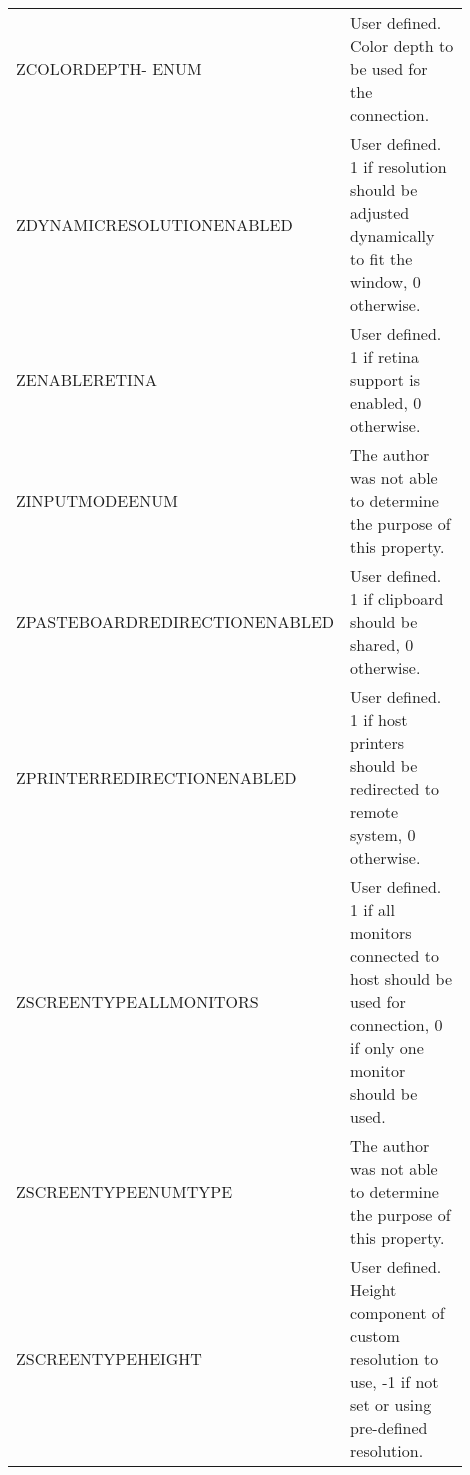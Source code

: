 \documentclass[journal]{IEEEtran}
\begin{document}
\begin{table}[h!]
\begin{tabular}{p{0.3\linewidth} | p{0.6\linewidth}}
ZCOLORDEPTH- ENUM               & User defined. Color depth to be used for the connection.                                                                                                                                       \\
ZDYNAMICRESOLUTIONENABLED     & User defined. 1 if resolution should be adjusted dynamically to fit the window, 0 otherwise. \\
ZENABLERETINA                 & User defined. 1 if retina support is enabled, 0 otherwise.                                                                                                                                     \\
ZINPUTMODEENUM                & The author was not able to determine the purpose of this property.                                                                                                                                                                                           \\
ZPASTEBOARDREDIRECTIONENABLED & User defined. 1 if clipboard should be shared, 0 otherwise.                                                                                                                                    \\
ZPRINTERREDIRECTIONENABLED    & User defined. 1 if host printers should be redirected to remote system, 0 otherwise.                                                                                                                                                                                           \\
ZSCREENTYPEALLMONITORS        & User defined. 1 if all monitors connected to host should be used for connection, 0 if only one monitor should be used.                                                                         \\
ZSCREENTYPEENUMTYPE           & The author was not able to determine the purpose of this property.                                                                                                                                                                                           \\
ZSCREENTYPEHEIGHT             & 
User defined. Height component of custom resolution to use, -1 if not set or using pre-defined resolution.                                                                                                                                                                                           \\

\end{tabular}
\end{table}
\end{document}
